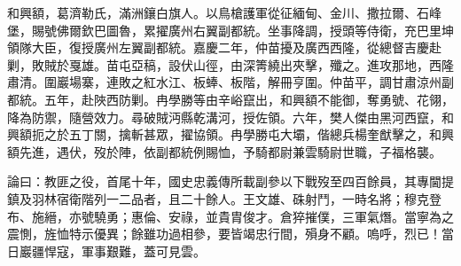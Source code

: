 \begin{pinyinscope}
和興額，葛濟勒氏，滿洲鑲白旗人。以鳥槍護軍從征緬甸、金川、撒拉爾、石峰堡，賜號佛爾欽巴圖魯，累擢廣州右翼副都統。坐事降調，授頭等侍衛，充巴里坤領隊大臣，復授廣州左翼副都統。嘉慶二年，仲苗擾及廣西西隆，從總督吉慶赴剿，敗賊於戛雄。苗屯亞稿，設伏山徑，由深箐繞出夾擊，殲之。進攻那地，西隆肅清。圍巖場寨，連敗之紅水江、板蜯、板階，解冊亨圍。仲苗平，調甘肅涼州副都統。五年，赴陜西防剿。冉學勝等由辛峪竄出，和興額不能御，奪勇號、花翎，降為防禦，隨營效力。尋破賊沔縣乾溝河，授佐領。六年，樊人傑由黑河西竄，和興額扼之於五丁關，擒斬甚眾，擢協領。冉學勝屯大壩，偕總兵楊奎猷擊之，和興額先進，遇伏，歿於陣，依副都統例賜恤，予騎都尉兼雲騎尉世職，子福格襲。

論曰：教匪之役，首尾十年，國史忠義傳所載副參以下戰歿至四百餘員，其專閫提鎮及羽林宿衛階列一二品者，且二十餘人。王文雄、硃射鬥，一時名將；穆克登布、施縉，亦號驍勇；惠倫、安祿，並貴胄俊才。倉猝摧僕，三軍氣熸。當寧為之震惻，旌恤特示優異；餘雖功過相參，要皆竭忠行間，殞身不顧。嗚呼，烈已！當日巖疆悍寇，軍事艱難，蓋可見雲。


\end{pinyinscope}